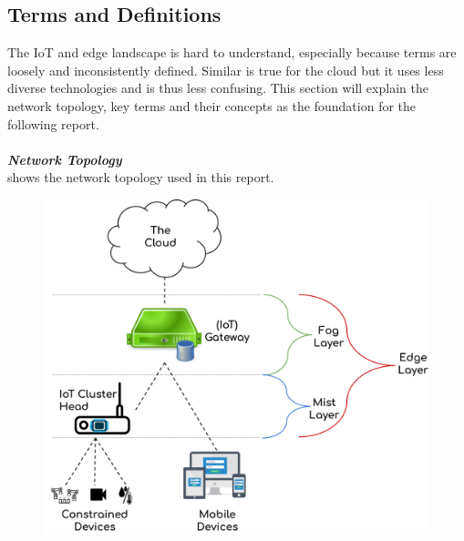 
\subsection{Terms and Definitions} \label{sec:definitions}
The IoT and edge landscape is hard to understand, especially because terms are loosely and inconsistently defined. Similar is true for the cloud but it uses less diverse technologies and is thus less confusing. This section will explain the network topology, key terms and their concepts as the foundation for the following report.\\
\vspace{0.5mm} \ \\
\textbf{\textit{Network Topology}}\\
 shows the network topology used in this report. 
\begin{figure}[H]
    \centering
    \includegraphics[scale=0.2]{figures/network-topology-3-layer.png}
    \label{fig:networkTopology3Layer}
\end{figure}


